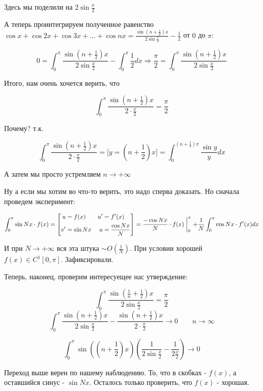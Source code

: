 \documentclass{article}
\begin{document}
Здесь мы поделили на $2 \sin{\frac{x}{2}}$

А теперь проинтегрируем полученное равенство $\cos{x} + \cos{2x} + \cos{3x} + \ldots + \cos{nx} = \frac{\sin{(n + \frac{1}{2})x}}{2\sin{\frac{x}{2}}} - \frac{1}{2}$ от $0$ до $\pi$: 

$$
0 = \int_0^\pi \frac{\sin{\left(n + \frac{1}{2}\right)}x}{2\sin{\frac{x}{2}}} - \int_0^\pi \frac{1}{2}dx \Rightarrow \frac{\pi}{2} = \int_0^\pi \frac{\sin{\left(n + \frac{1}{2}\right)}x}{2\sin{\frac{x}{2}}}
$$

Итого, нам очень хочется верить, что 

$$
\int_0^\pi \frac{\sin{\left(n+\frac{1}{2}\right)}x}{2 \cdot \frac{x}{2}} = \frac{\pi}{2}
$$

Почему? т.к.

$$
\int_0^\pi \frac{\sin{\left(n+\frac{1}{2}\right)}x}{2 \cdot \frac{x}{2}} = \big[y = (n + \frac{1}{2})x\big] = \int_0^{(n + \frac{1}{2})\pi} \frac{\sin y}{y} dx
$$

А затем мы просто устремляем $n \to +\infty$

Ну а если мы хотим во что-то верить, это надо сперва доказать. Но сначала проведем эксперимент:

$$
\int_0^\pi \sin{Nx} \cdot f(x) =
\left[
    \begin{alignedat}{2}
        u &= f(x)\quad & u' &= f'(x) \\ 
        v' &= \sin{Nx}\quad & u &= \frac{\cos{Nx}} {N}
    \end{alignedat}
\right]
= \frac{-\cos{Nx}}{N} \cdot f(x) \biggm|_0^\pi + \frac{1}{N}\int_0^\pi \cos{Nx} \cdot f'(x) dx
$$

И при $N \to +\infty$ вся эта штука $\sim O\left(\frac{1}{N}\right)$. При условии хорошей $f(x) \in C^1[0, \pi]$.
Зафиксировали.

Теперь, наконец, проверим интересуещее нас утверждение:

$$
\int_0^\pi \frac{\sin{\left(\frac{1}{n} + \frac{1}{2}\right)x}}{2\sin{\frac{x}{2}}} = \frac{\pi}{2}
$$
$$
\int_0^\pi \frac{\sin{\left(n + \frac{1}{2}\right)x}}{2\sin{\frac{x}{2}}} - \frac{\sin{\left(n + \frac{1}{2}\right)x}}{2\cdot \frac{x}{2}} \to 0 \qquad n\to \infty
$$

$$
\int_0^\pi \sin{\left(\left(n + \frac{1} {2}\right)x\right)} \left(\frac{1}{2\sin{\frac{x}{2}}} - \frac{1}{2 \frac{x}{2}}\right) \to 0
$$

Переход выше верен по нашему наблюдению. То, что в скобках - $f(x)$, а оставшийся синус - $\sin{Nx}$. Осталось только проверить, что $f(x)$ - хорошая.
\end{document}
